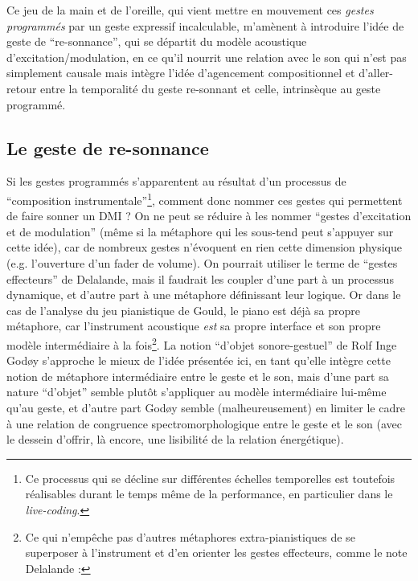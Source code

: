 \indent Ce jeu de la main et de l'oreille, qui vient mettre en mouvement ces \textit{gestes programmés} par un geste expressif incalculable, m'amènent à introduire l'idée de geste de ``re-sonnance'', qui se départit du modèle acoustique d'excitation/modulation, en ce qu'il nourrit une relation avec le son qui n'est pas simplement causale mais intègre l'idée d'agencement compositionnel et d'aller-retour entre la temporalité du geste re-sonnant et celle, intrinsèque au geste programmé.

\subsection{Le geste de re-sonnance}

\noindent Si les gestes programmés s'apparentent au résultat d'un processus de ``composition instrumentale''\footnote{Ce processus qui se décline sur différentes échelles temporelles est toutefois réalisables durant le temps même de la performance, en particulier dans le \textit{live-coding}.}, comment donc nommer ces gestes qui permettent de faire sonner un \gls{DMI} ? On ne peut se réduire à les nommer ``gestes d'excitation et de modulation'' (même si la métaphore qui les sous-tend peut s'appuyer sur cette idée), car de nombreux gestes n'évoquent en rien cette dimension physique (e.g. l'ouverture d'un fader de volume). On pourrait utiliser le terme de ``gestes effecteurs'' de Delalande, mais il faudrait les coupler d'une part à un processus dynamique, et d'autre part à une métaphore définissant leur logique. Or dans le cas de l'analyse du jeu pianistique de Gould, le piano est déjà sa propre métaphore, car l'instrument acoustique \textit{est} sa propre interface et son propre modèle intermédiaire à la fois\footnote{Ce qui n'empêche pas d'autres métaphores extra-pianistiques de se superposer à l'instrument et d'en orienter les gestes effecteurs, comme le note Delalande : }. La notion ``d'objet sonore-gestuel'' de Rolf Inge Godøy s'approche le mieux de l'idée présentée ici, en tant qu'elle intègre cette notion de métaphore intermédiaire entre le geste et le son, mais d'une part sa nature ``d'objet'' semble plutôt s'appliquer au modèle intermédiaire lui-même qu'au geste, et d'autre part Godøy semble (malheureusement) en limiter le cadre à une relation de congruence spectromorphologique entre le geste et le son (avec le dessein d'offrir, là encore, une lisibilité de la relation énergétique).\\
